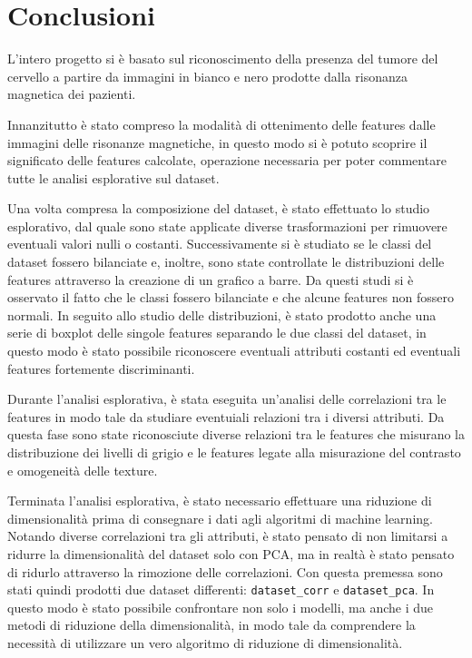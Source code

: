 \chapter{Conclusioni}

L'intero progetto si è basato sul riconoscimento della presenza del tumore del 
cervello a partire da immagini in bianco e nero prodotte dalla risonanza magnetica
dei pazienti.

Innanzitutto è stato compreso la modalità di ottenimento delle features dalle immagini
delle risonanze magnetiche, in questo modo si è potuto scoprire il significato 
delle features calcolate, operazione necessaria per poter commentare tutte le 
analisi esplorative sul dataset.

Una volta compresa la composizione del dataset, è stato effettuato lo studio esplorativo,
dal quale sono state applicate diverse trasformazioni per rimuovere eventuali valori
nulli o costanti. Successivamente si è studiato se le classi del dataset 
fossero bilanciate e, inoltre, sono state controllate le distribuzioni delle features
attraverso la creazione di un grafico a barre. Da questi studi si è osservato il fatto
che le classi fossero bilanciate e che alcune features non fossero normali.
In seguito allo studio delle distribuzioni, è stato prodotto anche una serie di
boxplot delle singole features separando le due classi del dataset, in questo
modo è stato possibile riconoscere eventuali attributi costanti ed eventuali 
features fortemente discriminanti.

Durante l'analisi esplorativa, è stata eseguita un'analisi delle correlazioni
tra le features in modo tale da studiare eventuiali relazioni tra i diversi attributi.
Da questa fase sono state riconosciute diverse relazioni tra le features che misurano
la distribuzione dei livelli di grigio e le features legate alla misurazione del 
contrasto e omogeneità delle texture.

Terminata l'analisi esplorativa, è stato necessario effettuare una riduzione di
dimensionalità prima di consegnare i dati agli algoritmi di machine learning. Notando 
diverse correlazioni tra gli attributi, è stato pensato di non limitarsi a ridurre
la dimensionalità del dataset solo con PCA, ma in realtà è stato pensato di ridurlo
attraverso la rimozione delle correlazioni. Con questa premessa sono stati quindi 
prodotti due dataset differenti: \texttt{dataset\_corr} e \texttt{dataset\_pca}.
In questo modo è stato possibile confrontare non solo i modelli, ma anche i due 
metodi di riduzione della dimensionalità, in modo tale da comprendere la necessità
di utilizzare un vero algoritmo di riduzione di dimensionalità.

